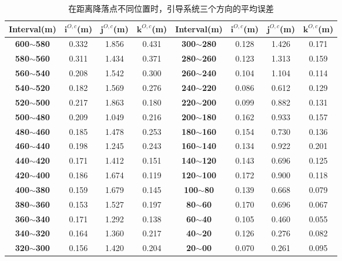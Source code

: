 \begin{table}[!th]
	\centering
	\caption{在距离降落点不同位置时，引导系统三个方向的平均误差}
	\label{lab:ground_landing}
	\begin{tabular}{cccc|cccc}
		\hline
		\textbf{Interval(m)} & \textbf{$\mathbf{i}^{O,c}$(m)} & \textbf{$\mathbf{j}^{O,c}$(m)} & \textbf{$\mathbf{k}^{O,c}$(m)} & \textbf{Interval(m)} & \textbf{$\mathbf{i}^{O,c}$(m)} & \textbf{$\mathbf{j}^{O,c}$(m)} & \textbf{$\mathbf{k}^{O,c}$(m)} \\ \hline
		\textbf{600$\sim$580} & 0.332 & 1.856 & 0.431 & \textbf{300$\sim$280} & 0.128 & 1.426 & 0.171 \\
		\textbf{580$\sim$560} & 0.311 & 1.434 & 0.371 & \textbf{280$\sim$260} & 0.123 & 1.313 & 0.159 \\
		\textbf{560$\sim$540} & 0.208 & 1.542 & 0.300 & \textbf{260$\sim$240} & 0.104 & 1.104 & 0.114 \\
		\textbf{540$\sim$520} & 0.182 & 1.569 & 0.276 & \textbf{240$\sim$220} & 0.086 & 0.612 & 0.129 \\
		\textbf{520$\sim$500} & 0.217 & 1.863 & 0.180 & \textbf{220$\sim$200} & 0.099 & 0.882 & 0.131 \\
		\textbf{500$\sim$480} & 0.209 & 1.049 & 0.216 & \textbf{200$\sim$180} & 0.162 & 0.933 & 0.157 \\
		\textbf{480$\sim$460} & 0.185 & 1.478 & 0.253 & \textbf{180$\sim$160} & 0.154 & 0.730 & 0.136 \\
		\textbf{460$\sim$440} & 0.198 & 1.245 & 0.243 & \textbf{160$\sim$140} & 0.134 & 0.922 & 0.201 \\
		\textbf{440$\sim$420} & 0.171 & 1.412 & 0.151 & \textbf{140$\sim$120} & 0.143 & 0.696 & 0.125 \\
		\textbf{420$\sim$400} & 0.186 & 1.674 & 0.119 & \textbf{120$\sim$100} & 0.172 & 0.900 & 0.118 \\
		\textbf{400$\sim$380} & 0.159 & 1.679 & 0.145 & \textbf{100$\sim$80} & 0.139 & 0.668 & 0.079 \\
		\textbf{380$\sim$360} & 0.153 & 1.527 & 0.197 & \textbf{80$\sim$60} & 0.170 & 0.696 & 0.067 \\
		\textbf{360$\sim$340} & 0.171 & 1.292 & 0.138 & \textbf{60$\sim$40} & 0.105 & 0.460 & 0.055 \\
		\textbf{340$\sim$320} & 0.164 & 1.360 & 0.217 & \textbf{40$\sim$20} & 0.126 & 0.276 & 0.082 \\
		\textbf{320$\sim$300} & 0.156 & 1.420 & 0.204 & \textbf{20$\sim$00} & 0.070 & 0.261 & 0.095 \\ \hline
	\end{tabular}
\end{table}


